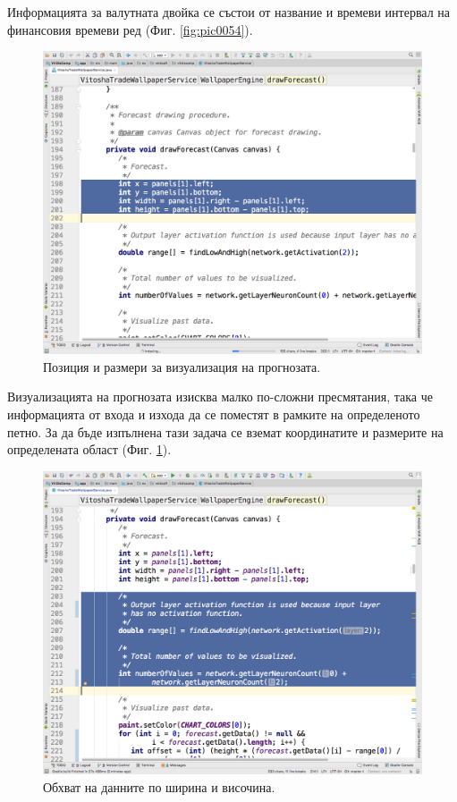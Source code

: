 \documentclass[book,14pt,oneside,openany]{memoir}
\begin{document}
Информацията за валутната двойка се състои от название и времеви интервал на финансовия времеви ред (Фиг. \ref{fig:pic0054}). 

\begin{figure}[h]
  \centering
  \includegraphics[height=0.45\pdfpageheight]{./images/pic0055.png}
  \caption{Позиция и размери за визуализация на прогнозата.}
\label{fig:pic0055}
\end{figure}
\FloatBarrier

Визуализацията на прогнозата изисква малко по-сложни пресмятания, така че информацията от входа и изхода да се поместят в рамките на определеното петно. За да бъде изпълнена тази задача се вземат координатите и размерите на определената област (Фиг. \ref{fig:pic0055}). 

\begin{figure}[h]
  \centering
  \includegraphics[height=0.45\pdfpageheight]{./images/pic0056.png}
  \caption{Обхват на данните по ширина и височина.}
\label{fig:pic0056}
\end{figure}
\FloatBarrier
\end{document}
